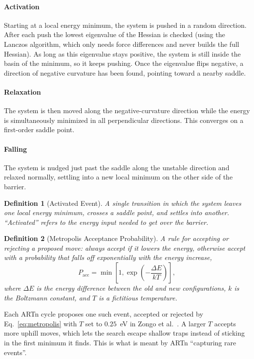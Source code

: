 \documentclass{article}
\newtheorem{definition}{Definition}
\begin{document}
\paragraph{Activation}
Starting at a local energy minimum, the system is pushed in a random direction. After each push the lowest eigenvalue of the Hessian is checked (using the Lanczos algorithm, which only needs force differences and never builds the full Hessian). As long as this eigenvalue stays positive, the system is still inside the basin of the minimum, so it keeps pushing. Once the eigenvalue flips negative, a direction of negative curvature has been found, pointing toward a nearby saddle.
\paragraph{Relaxation}
The system is then moved along the negative-curvature direction while the energy is simultaneously minimized in all perpendicular directions. This converges on a first-order saddle point.
\paragraph{Falling}
The system is nudged just past the saddle along the unstable direction and relaxed normally, settling into a new local minimum on the other side of the barrier.
\begin{definition}[Activated Event]
    A single transition in which the system leaves one local energy minimum, crosses a saddle point, and settles into another. ``Activated'' refers to the energy input needed to get over the barrier.
\end{definition}
\begin{definition}[Metropolis Acceptance Probability]
    A rule for accepting or rejecting a proposed move: always accept if it lowers the energy, otherwise accept with a probability that falls off exponentially with the energy increase,
    \begin{equation}
        P_{\text{acc}} = \min\!\left[1, \exp\!\left(-\frac{\Delta E}{k T}\right)\right],
        \label{eq:metropolis}
    \end{equation}
    where $\Delta E$ is the energy difference between the old and new configurations, $k$ is the Boltzmann constant, and $T$ is a fictitious temperature.
\end{definition}
Each ARTn cycle proposes one such event, accepted or rejected by Eq.~\ref{eq:metropolis} with $T$ set to $0.25$~eV in Zongo et al.~\cite{zongo2025}. A larger $T$ accepts more uphill moves, which lets the search escape shallow traps instead of sticking in the first minimum it finds. This is what is meant by ARTn ``capturing rare events''.
\end{document}
